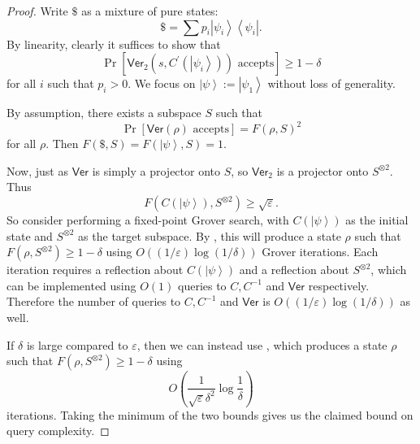 \begin{proof}
Write $\$$ as a mixture of pure states:%
\[
\$=\sum p_{i}\left\vert \psi_{i}\right\rangle \left\langle \psi_{i}\right\vert
.
\]
By linearity, clearly it suffices to show that%
\[
\Pr\left[  \mathsf{Ver}_{2}\left(  s,C^{\prime}\left(  \left\vert \psi
_{i}\right\rangle \right)  \right)  \text{ accepts}\right]  \geq1-\delta
\]
for all $i$ such that $p_{i}>0$. We focus on $\left\vert \psi\right\rangle
:=\left\vert \psi_{1}\right\rangle $ without loss of generality.

By assumption, there exists a subspace $S$ such that%
\[
\Pr\left[  \mathsf{Ver}\left(  \rho\right)  \text{ accepts}\right]  =F\left(
\rho,S\right)  ^{2}%
\]
for all $\rho$. Then $F\left(  \$,S\right)  =F\left(  \left\vert
\psi\right\rangle ,S\right)  =1$.

Now, just as $\mathsf{Ver}$ is simply a projector onto $S$, so $\mathsf{Ver}%
_{2}$ is a projector onto $S^{\otimes2}$. Thus%
\[
F\left(  C\left(  \left\vert \psi\right\rangle \right)  ,S^{\otimes2}\right)
\geq\sqrt{\varepsilon}.
\]
So consider performing a fixed-point Grover search, with $C\left(  \left\vert
\psi\right\rangle \right)  $ as the initial state and $S^{\otimes2}$ as the
target subspace. By , this will produce a state $\rho
$ such that $F\left(  \rho,S^{\otimes2}\right)  \geq1-\delta$ using
$O\left(({1}/{\varepsilon}) \log ({1}/{\delta})\right)  $ Grover
iterations. Each iteration requires a reflection about $C\left(  \left\vert
\psi\right\rangle \right)  $ and a reflection about $S^{\otimes2}$, which can
be implemented using $O\left(  1\right)  $ queries to $C,C^{-1}$ and
$\mathsf{Ver}$ respectively. Therefore the number of queries to $C,C^{-1}$
and $\mathsf{Ver}$ is $O\left(({1}/{\varepsilon}) \log ({1}/{\delta
})\right)$ as well.

If $\delta$ is large compared to $\varepsilon$, then we can instead use
, which produces a state $\rho$ such that $F\left(
\rho,S^{\otimes2}\right)  \geq1-\delta$ using 
\[
O\left(  \frac{1}
{\sqrt{\varepsilon}\delta^{2}}\log\frac{1}{\delta}\right)
\]
iterations.
Taking the minimum of the two bounds gives us the claimed bound on query complexity.
\end{proof}
